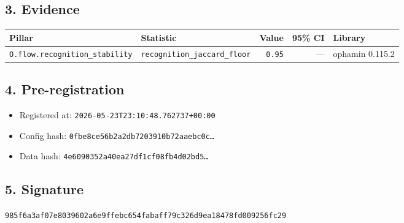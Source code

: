 \documentclass{article}
\begin{document}
\subsection*{3. Evidence}
\begin{tabular}{llrrl}\toprule
\textbf{Pillar} & \textbf{Statistic} & \textbf{Value} & \textbf{95\% CI} & \textbf{Library} \\\midrule
\texttt{O.flow.recognition\_stability} & \texttt{recognition\_jaccard\_floor} & \texttt{0.95} & --- & ophamin 0.115.2 \\
\bottomrule\end{tabular}
\subsection*{4. Pre-registration}
\begin{itemize}
\item Registered at: \texttt{2026-05-23T23:10:48.762737+00:00}
\item Config hash: \texttt{0fbe8ce56b2a2db7203910b72aaebc0c\dots}
\item Data hash: \texttt{4e6090352a40ea27df1cf08fb4d02bd5\dots}
\end{itemize}
\subsection*{5. Signature}
\texttt{985f6a3af07e8039602a6e9ffebc654fabaff79c326d9ea18478fd009256fc29}\\
\end{document}
